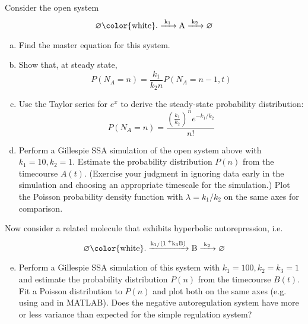\documentclass{article}
\begin{document}
Consider the open system
\[ \ce{\varnothing {\color{white} .} ->[k_1] A ->[k_2] \varnothing} \]
\begin{enumerate}[a)]
\item Find the master equation for this system.
\item Show that, at steady state,
\[ P(N_A = n) = \frac{k_1}{k_2 n} P(N_A = n-1, t) \]
\item Use the Taylor series for $e^x$ to derive the steady-state probability distribution:
\[ P(N_A = n) = \frac{\left( \frac{k_1}{k_2} \right)^n e^{-k_1/k_2}}{n!} \]
\item Perform a Gillespie SSA simulation of the open system above with $k_1=10, k_2=1$. Estimate the probability distribution $P(n)$ from the timecourse $A(t)$. (Exercise your judgment in ignoring data early in the simulation and choosing an appropriate timescale for the simulation.) Plot the Poisson probability density function with $\lambda=k_1/k_2$ on the same axes for comparison.
\end{enumerate}
Now consider a related molecule that exhibits hyperbolic autorepression, i.e.
\[ \ce{\varnothing {\color{white} .} ->[k_1/(1+k_3B)] B ->[k_2] \varnothing} \]
\begin{enumerate}[a)]
\setcounter{enumi}{4}
\item Perform a Gillespie SSA simulation of this system with $k_1=100, k_2=k_3=1$ and estimate the probability distribution $P(n)$ from the timecourse $B(t)$. Fit a Poisson distribution to $P(n)$ and plot both on the same axes (e.g. using  and  in MATLAB). Does the negative autoregulation system have more or less variance than expected for the simple regulation system?\end{enumerate}
\end{document}
